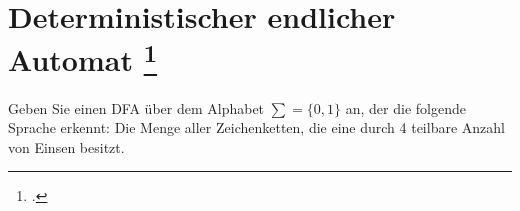 \documentclass{lehramt-informatik-aufgabe}
\begin{document}
\section{Deterministischer endlicher Automat
\footcite{theoinf:ab:1}}

Geben Sie einen DFA über dem Alphabet $\sum = \{0, 1\}$ an, der die
folgende Sprache erkennt: Die Menge aller Zeichenketten, die eine durch
4 teilbare Anzahl von Einsen besitzt.
\end{document}
